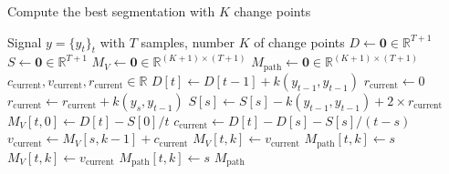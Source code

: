 \documentclass[12pt]{article}
\newcommand\RR{\mathbb{R}}
\begin{document}
\begin{algorithm}
    \small
    \caption{Compute the best segmentation with $K$ change points} %
    \label{alg:dynp} %
    \begin{algorithmic} %
        \REQUIRE Signal $y = \{y_t\}_t$ with $T$ samples, number $K$ of change points
        \STATE {}
        \STATE $D \gets \bm{0}\in\mathbb{R}^{T+1}$ 
        \STATE $S \gets \bm{0}\in\mathbb{R}^{T+1}$ 
        \STATE $M_V \gets \bm{0}\in\mathbb{R}^{(K+1)\times (T+1)}$ 
        \STATE $M_{\text{path}} \gets \bm{0}\in\mathbb{R}^{(K+1)\times (T+1)}$ 
        \STATE $c_{\text{current}}, v_{\text{current}}, r_{\text{current}}\in\RR$ 
        \STATE
        \STATE {}
        \STATE
        \STATE {}
        \STATE $D[t] \gets D[t-1] + k(y_{t-1}, y_{t-1})$ 
        \STATE
        \STATE {}
        \STATE $r_{\text{current}}\gets0$
        \STATE $r_{\text{current}} \gets r_{\text{current}} + k(y_{s}, y_{t-1})$ 
        \STATE $S[s] \gets S[s] - k(y_{t-1}, y_{t-1}) + 2\times r_{\text{current}}$ 
        \ENDFOR
        \STATE
        \STATE {}
        \STATE $M_{V}[t, 0] \gets D[t] - S[0]/t$ 
        \STATE $c_{\text{current}} \gets D[t]-D[s] - S[s]/(t-s)$ 
        \STATE $v_{\text{current}} \gets M_V[s, k-1] + c_{\text{current}}$ 
        \STATE $M_V[t, k] \gets v_{\text{current}}$
        \STATE $M_{\text{path}}[t, k] \gets s$
        \ELSE
        \STATE $M_V[t, k] \gets v_{\text{current}}$
        \STATE $M_{\text{path}}[t, k] \gets s$
        \ENDIF
        \ENDIF
        \ENDFOR
        \ENDFOR
        \ENDFOR
        \RETURN $M_{\text{path}}$
    \end{algorithmic}
\end{algorithm}



\end{document}
